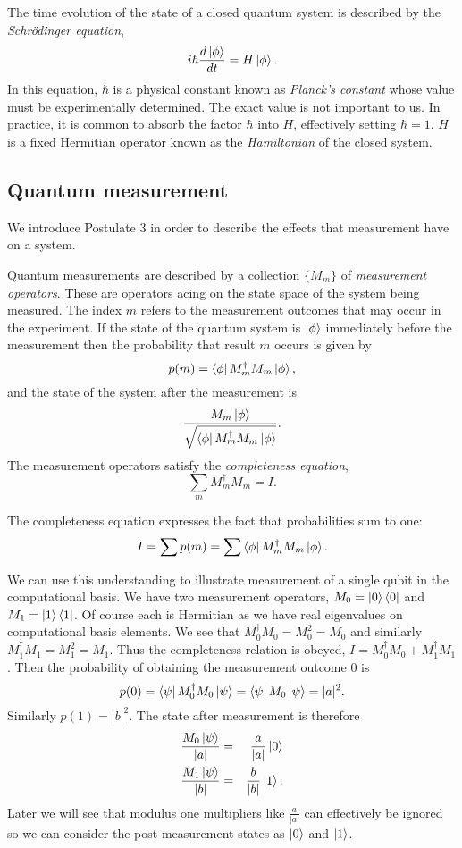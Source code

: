 \documentclass{article}
\begin{document}
\setcounter{postulate}{1}

\begin{postulate}[Revised]
  The time evolution of the state of a closed quantum system is described by the \textit{Schr\"odinger equation},
  \[i\hbar\frac{d\ket\phi}{dt}=H\ket\phi.\]
  In this equation, $\hbar$ is a physical constant known as \textit{Planck's constant} whose value must be experimentally determined. The exact value is not important to us. In practice, it is common to absorb the factor $\hbar$ into $H$, effectively setting $\hbar=1$. $H$ is a fixed Hermitian operator known as the \textit{Hamiltonian} of the closed system.
\end{postulate}

\subsection{Quantum measurement}

We introduce Postulate 3 in order to describe the effects that measurement have on a system.

\begin{postulate}
  Quantum measurements are described by a collection $\{M_m\}$ of \textit{measurement operators}. These are operators acing on the state space of the system being measured. The index $m$ refers to the measurement outcomes that may occur in the experiment. If the state of the quantum system is $\ket\phi$ immediately before the measurement then the probability that result $m$ occurs is given by
  \[p(m)=\bra{\phi}M_m^\dagger M_m\ket{\phi},\]
  and the state of the system after the measurement is
  \[\frac{M_m\ket{\phi}}{\sqrt{\bra\phi M_m^\dagger M_m\ket\phi}}.\]
  The measurement operators satisfy the \textit{completeness equation},
  \[\sum_m M_m^\dagger M_m = I.\]
\end{postulate}

The completeness equation expresses the fact that probabilities sum to one:
\[I=\sum p(m)=\sum \bra\phi M^\dagger_m M_m\ket\phi.\]


We can use this understanding to illustrate measurement of a single qubit in the computational basis. We have two measurement operators, $M_0=\ket{0}\bra{0}$ and $M_1=\ket{1}\bra{1}$. Of course each is Hermitian as we have real eigenvalues on computational basis elements. We see that $M_0^\dagger M_0=M_0^2=M_0$ and similarly $M_1^\dagger M_1=M_1^2=M_1$. Thus the completeness relation is obeyed, $I=M_0^\dagger M_0+M_1^\dagger M_1$. Then the probability of obtaining the measurement outcome $0$ is
\[
  p(0)=\bra{\psi}M_0^\dagger M_0\ket{\psi}
  =\bra{\psi}M_0\ket{\psi}=|a|^2.
\]
Similarly $p(1)=|b|^2$. The state after measurement is therefore
\begin{eqnarray*}
  \frac{M_0\ket\psi}{|a|}&=&\frac{a}{|a|}\ket0\\
  \frac{M_1\ket\psi}{|b|}&=&\frac{b}{|b|}\ket1.\\
\end{eqnarray*}
Later we will see that modulus one multipliers like $\frac{a}{|a|}$ can effectively be ignored so we can consider the post-measurement states as $\ket0$ and $\ket1$.
\end{document}
